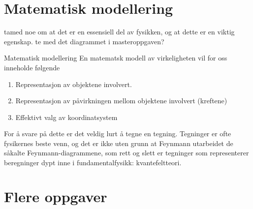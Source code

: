 

\section{Matematisk modellering}
tamed noe om at det er en essensiell del av fysikken, og at dette er en viktig egenskap. te med det diagrammet i masteroppgaven?

\begin{myoppsum*}{Matematisk modellering}
  En matematsk modell av virkeligheten vil for oss inneholde følgende 
  \begin{enumerate}
    \item Representasjon av objektene  involvert.
    \item Representasjon av påvirkningen mellom objektene involvert (kreftene)
    \item Effektivt valg av koordinatsystem
  \end{enumerate}
\end{myoppsum*}
For å svare på dette er det veldig lurt å tegne en tegning. Tegninger er ofte fysikernes beste venn, og det er ikke uten grunn at Feynmann utarbeidet de såkalte Feynmann-diagrammene, som rett og slett er tegninger som representerer beregninger dypt inne i fundamentalfysikk: kvantefeltteori.

\clearpage
\section{Flere oppgaver}


